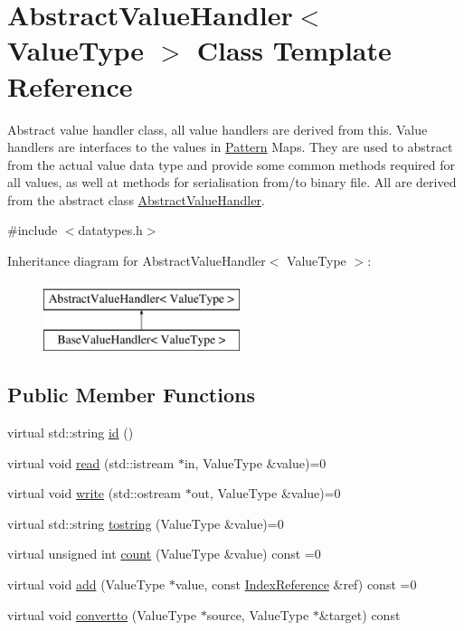 \hypertarget{classAbstractValueHandler}{}\section{Abstract\+Value\+Handler$<$ Value\+Type $>$ Class Template Reference}
\label{classAbstractValueHandler}


Abstract value handler class, all value handlers are derived from this. Value handlers are interfaces to the values in \hyperlink{classPattern}{Pattern} Maps. They are used to abstract from the actual value data type and provide some common methods required for all values, as well at methods for serialisation from/to binary file. All are derived from the abstract class \hyperlink{classAbstractValueHandler}{Abstract\+Value\+Handler}.  




{\ttfamily \#include $<$datatypes.\+h$>$}

Inheritance diagram for Abstract\+Value\+Handler$<$ Value\+Type $>$\+:\begin{figure}[H]
\begin{center}
\leavevmode
\includegraphics[height=2.000000cm]{classAbstractValueHandler}
\end{center}
\end{figure}
\subsection*{Public Member Functions}
\begin{DoxyCompactItemize}
\item 
virtual std\+::string \hyperlink{classAbstractValueHandler_a6e2f7abe130cdec1062e51d56e4f9fac}{id} ()
\item 
virtual void \hyperlink{classAbstractValueHandler_ac7921fae157361b054e467bf96785654}{read} (std\+::istream $\ast$in, Value\+Type \&value)=0
\item 
virtual void \hyperlink{classAbstractValueHandler_aecd2820bc132f8065babbec5cd7458b8}{write} (std\+::ostream $\ast$out, Value\+Type \&value)=0
\item 
virtual std\+::string \hyperlink{classAbstractValueHandler_a8e56e3bbccc464a47a666352249e6a1b}{tostring} (Value\+Type \&value)=0
\item 
virtual unsigned int \hyperlink{classAbstractValueHandler_a1d5941f6ff2afaee0c0bfc89ccb5188e}{count} (Value\+Type \&value) const  =0
\item 
virtual void \hyperlink{classAbstractValueHandler_a72ecec2580cb5a9a3ba1495a98d08d98}{add} (Value\+Type $\ast$value, const \hyperlink{classIndexReference}{Index\+Reference} \&ref) const  =0
\item 
virtual void \hyperlink{classAbstractValueHandler_ae89579ec77805153a0acc617202f89b4}{convertto} (Value\+Type $\ast$source, Value\+Type $\ast$\&target) const 
\end{DoxyCompactItemize}


